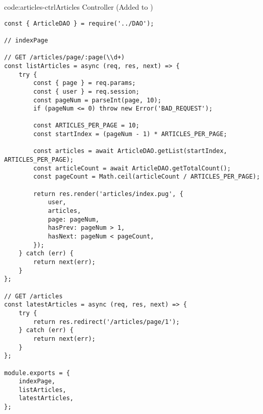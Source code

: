 \begin{code}{code:articles-ctrl}{Articles Controller (Added to )}
\begin{verbatim}
const { ArticleDAO } = require('../DAO');

// indexPage

// GET /articles/page/:page(\\d+)
const listArticles = async (req, res, next) => {
    try {
        const { page } = req.params;
        const { user } = req.session;
        const pageNum = parseInt(page, 10);
        if (pageNum <= 0) throw new Error('BAD_REQUEST');

        const ARTICLES_PER_PAGE = 10;
        const startIndex = (pageNum - 1) * ARTICLES_PER_PAGE;

        const articles = await ArticleDAO.getList(startIndex, ARTICLES_PER_PAGE);
        const articleCount = await ArticleDAO.getTotalCount();
        const pageCount = Math.ceil(articleCount / ARTICLES_PER_PAGE);

        return res.render('articles/index.pug', {
            user,
            articles,
            page: pageNum,
            hasPrev: pageNum > 1,
            hasNext: pageNum < pageCount,
        });
    } catch (err) {
        return next(err);
    }
};

// GET /articles
const latestArticles = async (req, res, next) => {
    try {
        return res.redirect('/articles/page/1');
    } catch (err) {
        return next(err);
    }
};

module.exports = {
    indexPage,
    listArticles,
    latestArticles,
};
\end{verbatim}
\end{code}
